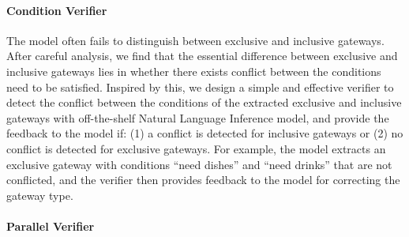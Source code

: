 \paragraph{Condition Verifier}



The model often fails to distinguish between exclusive and inclusive gateways. 
After careful analysis, we find that the essential difference between exclusive and inclusive gateways lies in whether there exists conflict between the conditions need to be satisfied. 
Inspired by this, we design a simple and effective verifier to detect the conflict between the conditions of the extracted exclusive and inclusive gateways with off-the-shelf Natural Language Inference model, and provide the feedback to the model if: (1) a conflict is detected for inclusive gateways or (2) no conflict is detected for exclusive gateways. 
For example, the model extracts an exclusive gateway with conditions ``need dishes'' and ``need drinks'' that are not conflicted, and the verifier then provides feedback to the model for correcting the gateway type. 

\paragraph{Parallel Verifier}

